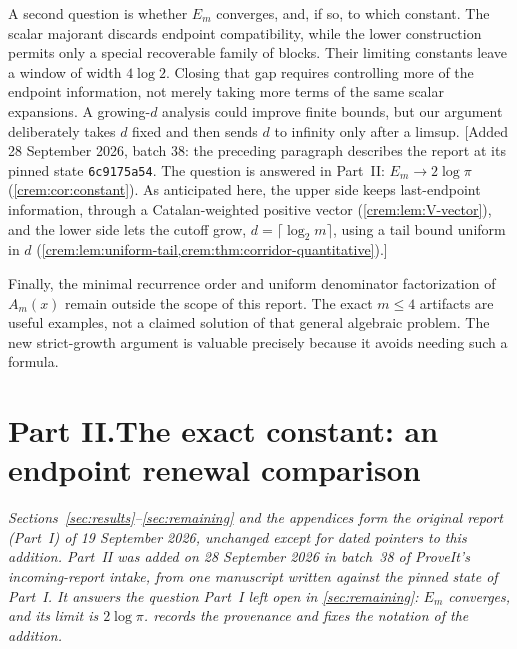 \documentclass[11pt,a4paper]{article}
\theoremstyle{definition}\newaliascnt{definition}{theorem}
\theoremstyle{remark}\newaliascnt{remark}{theorem}
\begin{document}
A second question is whether $E_m$ converges, and, if so, to which constant.
The scalar majorant discards endpoint compatibility, while the lower
construction permits only a special recoverable family of blocks. Their
limiting constants leave a window of width $4\log2$. Closing that gap
requires controlling more of the endpoint information, not merely taking
more terms of the same scalar expansions. A growing-$d$ analysis could
improve finite bounds, but our argument deliberately takes $d$ fixed and
then sends $d$ to infinity only after a limsup.
[Added 28 September 2026, batch 38: the preceding paragraph describes the
report at its pinned state \texttt{6c9175a54}. The question is answered in
Part~II: $E_m\to2\log\pi$ (\cref{crem:cor:constant}). As anticipated here,
the upper side keeps last-endpoint information, through a Catalan-weighted
positive vector (\cref{crem:lem:V-vector}), and the lower side lets the
cutoff grow, $d=\lceil\log_2m\rceil$, using a tail bound uniform in $d$
(\cref{crem:lem:uniform-tail,crem:thm:corridor-quantitative}).]

Finally, the minimal recurrence order and uniform denominator factorization
of $A_m(x)$ remain outside the scope of this report. The exact $m\le4$
artifacts are useful examples, not a claimed solution of that general
algebraic problem. The new strict-growth argument is valuable precisely
because it avoids needing such a formula.

\clearpage
{}\part*{Part II.\quad The exact constant: an endpoint renewal comparison}

\noindent\emph{Sections~\ref{sec:results}--\ref{sec:remaining} and the
appendices form the original report (Part~I) of 19 September 2026,
unchanged except for dated pointers to this addition. Part~II was added on
28 September 2026 in batch~38 of ProveIt's incoming-report intake, from one
manuscript written against the pinned state of Part~I. It answers the
question Part~I left open in \cref{sec:remaining}: $E_m$ converges, and its
limit is $2\log\pi$.  records the provenance and fixes
the notation of the addition.}
\end{document}
